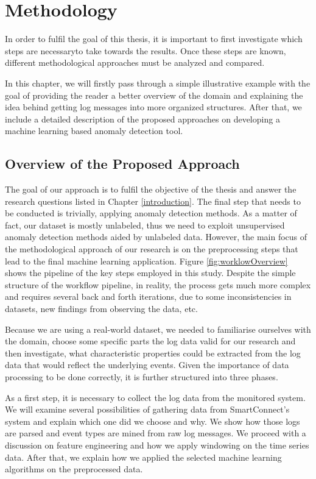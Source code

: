 \chapter{Methodology}
\label{methodology}

In order to fulfil the goal of this thesis, it is important to first investigate which steps are necessaryto take towards the results. Once these steps are known, different methodological approaches must be analyzed and compared.

In this chapter, we will firstly pass through a simple illustrative example with the goal of providing the reader a better overview of the domain and explaining the idea behind getting log messages into more organized structures. After that, we include a detailed description of the proposed approaches on developing a machine learning based anomaly detection tool. 

\section{Overview of the Proposed Approach}
The goal of our approach is to fulfil the objective of the thesis and answer the research questions listed in Chapter \ref{introduction}. The final step that needs to be conducted is trivially, applying anomaly detection methods. As a matter of fact, our dataset is mostly unlabeled, thus we need to exploit unsupervised anomaly detection methods aided by unlabeled data. However, the main focus of the methodological approach of our research is on the preprocessing steps that lead to the final machine learning application. Figure \ref{fig:worklowOverview} shows the pipeline of the key steps employed in this study. Despite the simple structure of the workflow pipeline, in reality, the process gets much more complex and requires several back and forth iterations, due to some inconsistencies in datasets, new findings from observing the data, etc.

Because we are using a real-world dataset, we needed to familiarise ourselves with the domain, choose some specific parts the log data valid for our research and then investigate, what characteristic properties could be extracted from the log data that would reflect the underlying events. Given the importance of data processing to be done correctly, it is further structured into three phases.

As a first step, it is necessary to collect the log data from the monitored system. We will examine several possibilities of gathering data from SmartConnect's system and explain which one did we choose and why. We show how those logs are parsed and event types are mined from raw log messages. We proceed with a discussion on feature engineering and how we apply windowing on the time series data. After that, we explain how we applied the selected machine learning algorithms on the preprocessed data. 

